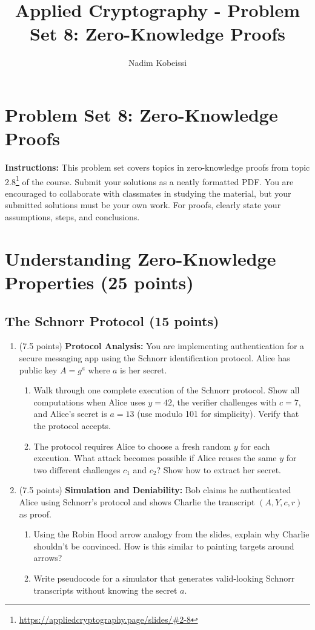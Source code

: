 \documentclass[10pt,a4paper,american]{exam}
\title{Applied Cryptography - Problem Set 8: Zero-Knowledge Proofs}
\author{Nadim Kobeissi}
\begin{document}
\classhandoutheader
\section*{Problem Set 8: Zero-Knowledge Proofs}

\begin{tcolorbox}[colframe=OliveGreen!30!white,colback=OliveGreen!5!white]
	\textbf{Instructions:} This problem set covers topics in zero-knowledge proofs from topic 2.8\footnote{\url{https://appliedcryptography.page/slides/\#2-8}} of the course. Submit your solutions as a neatly formatted PDF. You are encouraged to collaborate with classmates in studying the material, but your submitted solutions must be your own work. For proofs, clearly state your assumptions, steps, and conclusions.
\end{tcolorbox}

\section{Understanding Zero-Knowledge Properties (25 points)}

\subsection{The Schnorr Protocol (15 points)}

\begin{enumerate}
	\item (7.5 points) \textbf{Protocol Analysis:}
	      You are implementing authentication for a secure messaging app using the Schnorr identification protocol. Alice has public key $A = g^a$ where $a$ is her secret.
	      \begin{enumerate}
		      \item Walk through one complete execution of the Schnorr protocol. Show all computations when Alice uses $y = 42$, the verifier challenges with $c = 7$, and Alice's secret is $a = 13$ (use modulo 101 for simplicity). Verify that the protocol accepts.
		      \item The protocol requires Alice to choose a fresh random $y$ for each execution. What attack becomes possible if Alice reuses the same $y$ for two different challenges $c_1$ and $c_2$? Show how to extract her secret.
	      \end{enumerate}
	\item (7.5 points) \textbf{Simulation and Deniability:}
	      Bob claims he authenticated Alice using Schnorr's protocol and shows Charlie the transcript $(A, Y, c, r)$ as proof.
	      \begin{enumerate}
		      \item Using the Robin Hood arrow analogy from the slides, explain why Charlie shouldn't be convinced. How is this similar to painting targets around arrows?
		      \item Write pseudocode for a simulator that generates valid-looking Schnorr transcripts without knowing the secret $a$.
	      \end{enumerate}
\end{enumerate}
\end{document}
